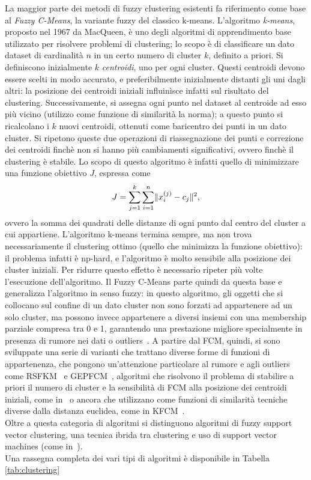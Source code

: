 \documentclass{article}
\DeclarePairedDelimiter{\norma}{\lVert}{\rVert}
\begin{document}
		La maggior parte dei metodi di fuzzy clustering esistenti fa riferimento come base al \textit{Fuzzy C-Means}, la variante fuzzy del classico k-means. L'algoritmo \textit{k-means}, proposto nel 1967 da MacQueen, è uno degli algoritmi di apprendimento base utilizzato per risolvere problemi di clustering; lo scopo è di classificare un dato dataset di cardinalità $n$ in un certo numero di cluster $k$, definito a priori.
		Si definiscono inizialmente $k$ \textit{centroidi}, uno per ogni cluster. Questi centroidi devono essere scelti in modo accurato, e preferibilmente inizialmente distanti gli uni dagli altri: la posizione dei centroidi iniziali influinìsce infatti sul risultato del clustering. Successivamente, si assegna ogni punto nel dataset al centroide ad esso più vicino (utilizzo come funzione di similarità la norma); a questo punto si ricalcolano i $k$ nuovi centroidi, ottenuti come baricentro dei punti in un dato cluster. Si ripetono queste due operazioni di riassegnazione dei punti e correzione dei centroidi finchè non si hanno più cambiamenti significativi, ovvero finchè il clustering è stabile. Lo scopo di questo algoritmo è infatti quello di minimizzare una funzione obiettivo $J$, espressa come
		\[
			J = \sum_{j=1}^{k}\sum_{i=1}^{n}\norma{x_i^{(j)}-c_j}^2\text{,}
		\]
		ovvero la somma dei quadrati delle distanze di ogni punto dal centro del cluster a cui appartiene. 
		L'algoritmo k-means termina sempre, ma non trova necessariamente il clustering ottimo (quello che minimizza la funzione obiettivo): il problema infatti è np-hard, e l'algoritmo è molto sensibile alla posizione dei cluster iniziali. Per ridurre questo effetto è necessario ripeter più volte l'esecuzione dell'algoritmo.
		Il Fuzzy C-Means parte quindi da questa base e generalizza l'algoritmo in senso fuzzy: in questo algoritmo, gli oggetti che si collocano sul confine di un dato cluster non sono forzati ad appartenere ad un solo cluster, ma possono invece appartenere a diversi insiemi con una membership parziale compresa tra 0 e 1, garantendo una prestazione migliore specialmente in presenza di rumore nei dati o outliers~\cite{bib:kmvsfcm}. A partire dal FCM, quindi, si sono sviluppate una serie di varianti che trattano diverse forme di funzioni di appartenenza, che pongono un'attenzione particolare al rumore e agli outliers come RSFKM~\cite{bib:rsfkm} e GEPFCM~\cite{bib:gepfcm}, algoritmi che risolvono il problema di stabilire a priori il numero di cluster e la sensibilità di FCM alla posizione dei centroidi iniziali, come in~\cite{bib:afkm} o ancora che utilizzano come funzioni di similarità tecniche diverse dalla distanza euclidea, come in KFCM~\cite{bib:kfcm}.
		\\
		Oltre a questa categoria di algoritmi si distinguono algoritmi di fuzzy support vector clustering, una tecnica ibrida tra clustering e uso di support vector machines (come in~\cite{bib:svc}\cite{bib:msvc}).
		\\
		Una rassegna completa dei vari tipi di algoritmi è disponibile in Tabella \ref{tab:clustering}
	
\end{document}
